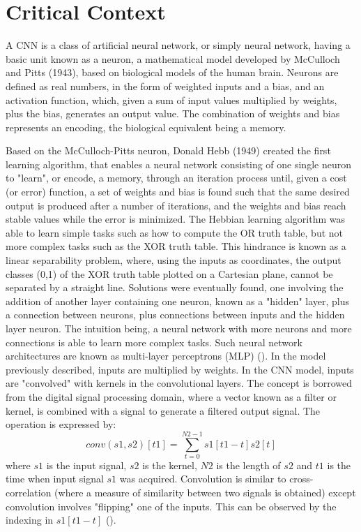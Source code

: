 \section{Critical Context}

A CNN is a class of artificial neural network, or simply neural network, having a basic unit known as a neuron, a mathematical model developed by McCulloch and Pitts (1943), based on biological models of the human brain. Neurons are defined as real numbers, in the form of weighted inputs and a bias, and an activation function, which, given a sum of input values multiplied by weights, plus the bias, generates an output value. The combination of weights and bias represents an encoding, the biological equivalent being a memory. 

Based on the McCulloch-Pitts neuron, Donald Hebb (1949) created the first learning algorithm, that enables a neural network consisting of one single neuron to "learn", or encode, a memory, through an iteration process until, given a cost (or error) function, a set of weights and bias is found such that the same desired output is produced after a number of iterations, and the weights and bias reach stable values while the error is minimized. The Hebbian learning algorithm was able to learn simple tasks such as how to compute the OR truth table, but not more complex tasks such as the XOR truth table. This hindrance is known as a linear separability problem, where, using the inputs as coordinates, the output classes (0,1) of the XOR truth table plotted on a Cartesian plane, cannot be separated by a straight line. Solutions were eventually found, one involving the addition of another layer containing one neuron, known as a "hidden" layer, plus a connection between neurons, plus connections between inputs and the hidden layer neuron. The intuition being, a neural network with more neurons and more connections is able to learn more complex tasks. Such neural network architectures are known as multi-layer perceptrons (MLP) (\cite{Garcez}).  
In the model previously described, inputs are multiplied by weights. In the CNN model, inputs are "convolved" with kernels in the convolutional layers. The concept is borrowed from the digital signal processing domain, where a vector known as a filter or kernel, is combined with a signal to generate a filtered output signal. The operation is expressed by:
\begin{equation}
\label{eqn:1dconv}
conv(s1,s2)[t1]=\sum_{t=0}^{N2-1} s1[t1-t]s2[t]    
\end{equation}
where $s1$ is the input signal, $s2$ is the kernel, $N2$ is the length of $s2$ and $t1$ is the time when input signal $s1$ was acquired. Convolution is similar to cross-correlation (where a measure of similarity between two signals is obtained) except convolution involves "flipping" one of the inputs. This can be observed by the indexing in $s1[t1-t]$ (\cite{Pauwels}). 

